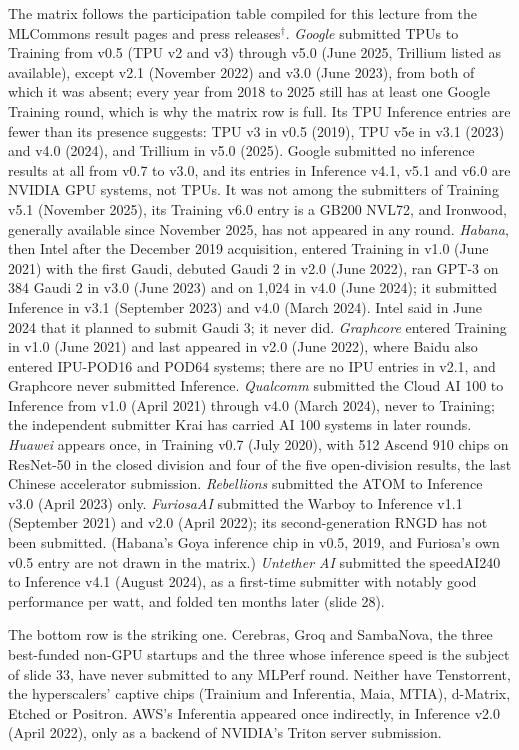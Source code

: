 \documentclass[11pt,letterpaper]{article}
\begin{document}
The matrix follows the participation table compiled for this lecture from the MLCommons result pages and press releases$^\dagger$. \emph{Google} submitted TPUs to Training from v0.5 (TPU v2 and v3) through v5.0 (June 2025, Trillium listed as available), except v2.1 (November 2022) and v3.0 (June 2023), from both of which it was absent; every year from 2018 to 2025 still has at least one Google Training round, which is why the matrix row is full. Its TPU Inference entries are fewer than its presence suggests: TPU v3 in v0.5 (2019), TPU v5e in v3.1 (2023) and v4.0 (2024), and Trillium in v5.0 (2025). Google submitted no inference results at all from v0.7 to v3.0, and its entries in Inference v4.1, v5.1 and v6.0 are NVIDIA GPU systems, not TPUs. It was not among the submitters of Training v5.1 (November 2025), its Training v6.0 entry is a GB200 NVL72, and Ironwood, generally available since November 2025, has not appeared in any round. \emph{Habana}, then Intel after the December 2019 acquisition, entered Training in v1.0 (June 2021) with the first Gaudi, debuted Gaudi 2 in v2.0 (June 2022), ran GPT-3 on 384 Gaudi 2 in v3.0 (June 2023) and on 1{,}024 in v4.0 (June 2024); it submitted Inference in v3.1 (September 2023) and v4.0 (March 2024). Intel said in June 2024 that it planned to submit Gaudi 3; it never did. \emph{Graphcore} entered Training in v1.0 (June 2021) and last appeared in v2.0 (June 2022), where Baidu also entered IPU-POD16 and POD64 systems; there are no IPU entries in v2.1, and Graphcore never submitted Inference. \emph{Qualcomm} submitted the Cloud AI 100 to Inference from v1.0 (April 2021) through v4.0 (March 2024), never to Training; the independent submitter Krai has carried AI 100 systems in later rounds. \emph{Huawei} appears once, in Training v0.7 (July 2020), with 512 Ascend 910 chips on ResNet-50 in the closed division and four of the five open-division results, the last Chinese accelerator submission. \emph{Rebellions} submitted the ATOM to Inference v3.0 (April 2023) only. \emph{FuriosaAI} submitted the Warboy to Inference v1.1 (September 2021) and v2.0 (April 2022); its second-generation RNGD has not been submitted. (Habana's Goya inference chip in v0.5, 2019, and Furiosa's own v0.5 entry are not drawn in the matrix.) \emph{Untether AI} submitted the speedAI240 to Inference v4.1 (August 2024), as a first-time submitter with notably good performance per watt, and folded ten months later (slide 28).

The bottom row is the striking one. Cerebras, Groq and SambaNova, the three best-funded non-GPU startups and the three whose inference speed is the subject of slide 33, have never submitted to any MLPerf round. Neither have Tenstorrent, the hyperscalers' captive chips (Trainium and Inferentia, Maia, MTIA), d-Matrix, Etched or Positron. AWS's Inferentia appeared once indirectly, in Inference v2.0 (April 2022), only as a backend of NVIDIA's Triton server submission.
\end{document}
